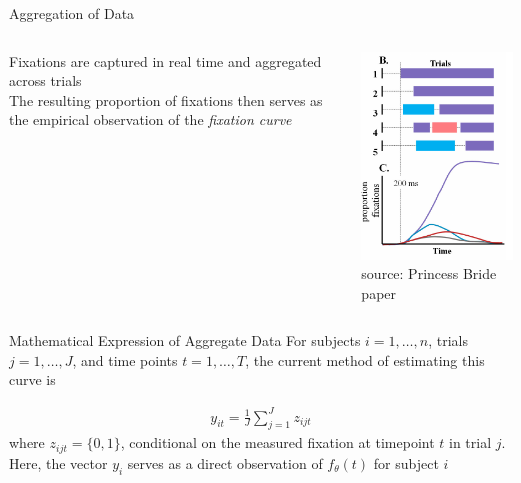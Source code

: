 \documentclass{beamer}
\begin{document}
\begin{frame}{Aggregation of Data}
\begin{columns}
\begin{column}{0.35\textwidth}


Fixations are captured in real time and aggregated across trials \newline \\

The resulting proportion of fixations then serves as the empirical observation of the \textit{fixation curve}
\end{column}
\begin{column}{0.65\textwidth}  %
\begin{center}
\includegraphics[scale=0.55]{img/bob_aggregate.png}
\\
{\tiny source: Princess Bride paper}
\end{center}
\end{column}
\end{columns}
\end{frame}

\begin{frame}{Mathematical Expression of Aggregate Data}
For subjects $i = 1, \dots, n$, trials $j = 1, \dots, J$, and time points $t = 1, \dots, T$, the current method of estimating this curve is 

\begin{align*}
y_{it} = \frac{1}{J} \sum_{j=1}^J z_{ijt}
\end{align*}
where $z_{ijt} = \{0,1\}$, conditional on the measured fixation at timepoint $t$ in trial $j$. \newline \\

Here, the vector $y_i$ serves as a direct observation of $f_{\theta}(t)$ for subject $i$ 
\end{frame}
\end{document}
